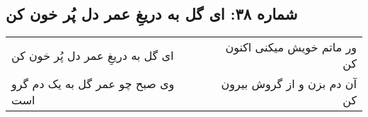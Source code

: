 \begin{center}
\section*{شماره ۳۸: ای گل به دریغِ عمر دل پُر خون کن}
\label{sec:038}
\begin{longtable}{l p{0.5cm} r}
ای گل به دریغِ عمر دل پُر خون کن
&&
ور ماتم خویش میکنی اکنون کن
\\
وی صبح چو عمر گل به یک دم گرو است
&&
آن دم بزن و از گروش بیرون کن
\\
\end{longtable}
\end{center}
